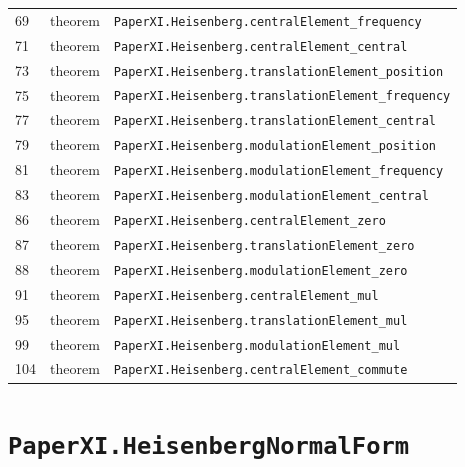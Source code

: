 \documentclass[10pt,oneside]{book}
\begin{document}
\begin{longtable}{@{}p{}p{}p{}@{}}
69&theorem&\nolinkurl{PaperXI.Heisenberg.centralElement_frequency}\\

71&theorem&\nolinkurl{PaperXI.Heisenberg.centralElement_central}\\

73&theorem&\nolinkurl{PaperXI.Heisenberg.translationElement_position}\\

75&theorem&\nolinkurl{PaperXI.Heisenberg.translationElement_frequency}\\

77&theorem&\nolinkurl{PaperXI.Heisenberg.translationElement_central}\\

79&theorem&\nolinkurl{PaperXI.Heisenberg.modulationElement_position}\\

81&theorem&\nolinkurl{PaperXI.Heisenberg.modulationElement_frequency}\\

83&theorem&\nolinkurl{PaperXI.Heisenberg.modulationElement_central}\\

86&theorem&\nolinkurl{PaperXI.Heisenberg.centralElement_zero}\\

87&theorem&\nolinkurl{PaperXI.Heisenberg.translationElement_zero}\\

88&theorem&\nolinkurl{PaperXI.Heisenberg.modulationElement_zero}\\

91&theorem&\nolinkurl{PaperXI.Heisenberg.centralElement_mul}\\

95&theorem&\nolinkurl{PaperXI.Heisenberg.translationElement_mul}\\

99&theorem&\nolinkurl{PaperXI.Heisenberg.modulationElement_mul}\\

104&theorem&\nolinkurl{PaperXI.Heisenberg.centralElement_commute}\\

\bottomrule\end{longtable}

\section{\texorpdfstring{\nolinkurl{PaperXI.HeisenbergNormalForm}}{PaperXI.HeisenbergNormalForm}}\label{module:PaperXI.HeisenbergNormalForm}
\end{document}
